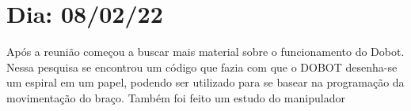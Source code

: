 \chapter{Dia: 08/02/22}
\label{chap:08-02-22}

Após a reunião começou a buscar mais material sobre o funcionamento do Dobot. Nessa pesquisa se encontrou um código \cite{Dobotand76:online} que fazia com que o DOBOT desenha-se um espiral em um papel, podendo ser utilizado para se basear na programação da movimentação do braço. Também foi feito um estudo do manipulador